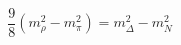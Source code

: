 \begin{equation}      
\frac{9}{8} (m_{\rho}^{2} - m_{\pi}^{2}) = m_{\Delta}^{2} - m_{N}^{2}      
\end{equation} 
